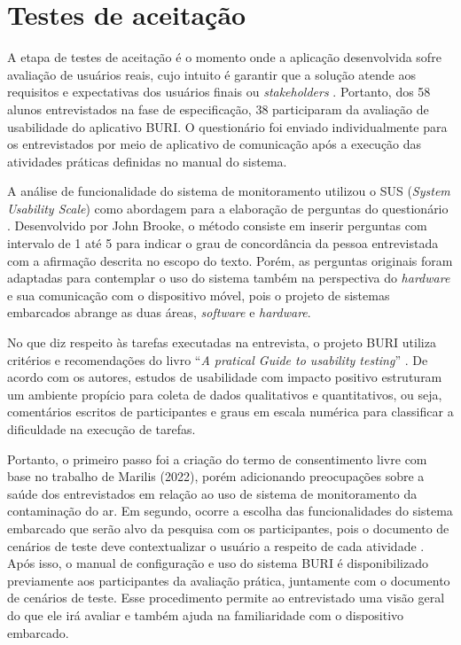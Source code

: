 \section{Testes de aceitação}\label{fase5}

A etapa de testes de aceitação é o momento onde a aplicação desenvolvida sofre avaliação 
de usuários reais, cujo intuito é garantir que a solução atende aos requisitos e expectativas dos usuários finais ou \textit{stakeholders} \cite{system-design-IOT}. 
Portanto, dos 58 alunos entrevistados na fase de especificação, 38 participaram da avaliação de usabilidade do 
aplicativo BURI. O questionário foi enviado individualmente para os entrevistados por meio de aplicativo de comunicação após 
a execução das atividades práticas definidas no manual do sistema.

A análise de funcionalidade do sistema de monitoramento utilizou o SUS (\textit{System Usability Scale}) como abordagem para a elaboração de perguntas do questionário \cite{sus-design-questionario}. Desenvolvido por John Brooke, o método 
consiste em inserir perguntas com intervalo de 1 até 5 para indicar o grau de concordância da pessoa entrevistada com a afirmação descrita no escopo do texto. Porém, as perguntas originais foram adaptadas para contemplar o uso do sistema 
também na perspectiva do \textit{hardware} e sua comunicação com o dispositivo móvel, pois o projeto de sistemas embarcados abrange as duas áreas, \textit{software} e \textit{hardware}.

No que diz respeito às tarefas executadas na entrevista, o projeto BURI utiliza critérios e 
recomendações do livro ``\textit{A pratical Guide to usability testing}'' \cite{tarefas-design}. De acordo com os autores, estudos 
de usabilidade com impacto positivo estruturam um ambiente propício para coleta de dados qualitativos e quantitativos, ou seja, comentários escritos de participantes e 
graus em escala numérica para classificar a dificuldade na execução de tarefas. 

Portanto, o primeiro passo foi a criação do termo de consentimento livre com base no trabalho de Marilis (2022), porém adicionando preocupações sobre a saúde dos entrevistados 
em relação ao uso de sistema de monitoramento da contaminação do ar. Em segundo, ocorre a escolha das funcionalidades do sistema embarcado que serão alvo da pesquisa com os participantes, pois 
o documento de cenários de teste deve contextualizar o usuário a respeito de cada atividade \cite{tarefas-design}. Após isso, o manual de configuração e uso do sistema BURI é disponibilizado 
previamente aos participantes da avaliação prática, juntamente com o documento de cenários de teste. Esse procedimento permite ao entrevistado uma visão geral do que ele irá avaliar e também 
ajuda na familiaridade com o dispositivo embarcado.

